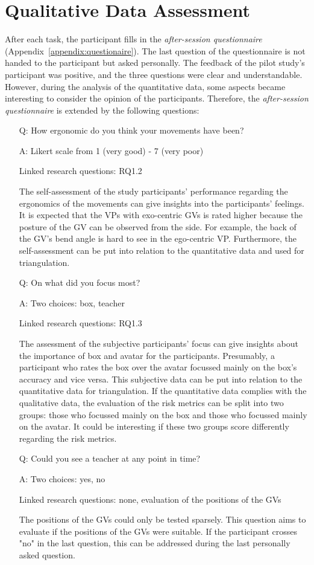 \section{Qualitative Data Assessment}
\label{sec:evalQuali}
After each task, the participant fills in the \textit{after-session questionnaire} (Appendix~\ref{appendix:questionaire}). The last question of the questionnaire is not handed to the participant but asked personally. The feedback of the pilot study's participant was positive, and the three questions were clear and understandable. However, during the analysis of the quantitative data, some aspects became interesting to consider the opinion of the participants. Therefore, the \textit{after-session questionnaire} is extended by the following questions:
\begin{itemize}
	\item[Q:] How ergonomic do you think your movements have been?
	\item[A:] Likert scale from 1 (very good) - 7 (very poor)
	\item[] Linked research questions: RQ1.2
	\item[] The self-assessment of the study participants' performance regarding the ergonomics of the movements can give insights into the participants' feelings. It is expected that the VPs with exo-centric GVs is rated higher because the posture of the GV can be observed from the side. For example, the back of the GV's bend angle is hard to see in the ego-centric VP. Furthermore, the self-assessment can be put into relation to the quantitative data and used for triangulation.
	\item[Q:] On what did you focus most?
	\item[A:] Two choices: box, teacher
	\item[] Linked research questions: RQ1.3
	\item[] The assessment of the subjective participants' focus can give insights about the importance of box and avatar for the participants. Presumably, a participant who rates the box over the avatar focussed mainly on the box's accuracy and vice versa. This subjective data can be put into relation to the quantitative data for triangulation. If the quantitative data complies with the qualitative data, the evaluation of the risk metrics can be split into two groups: those who focussed mainly on the box and those who focussed mainly on the avatar. It could be interesting if these two groups score differently regarding the risk metrics.
	\item[Q:] Could you see a teacher at any point in time?
	\item[A:] Two choices: yes, no
	\item[] Linked research questions: none, evaluation of the positions of the GVs
	\item[] The positions of the GVs could only be tested sparsely. This question aims to evaluate if the positions of the GVs were suitable. If the participant crosses "no" in the last question, this can be addressed during the last personally asked question.
\end{itemize}
